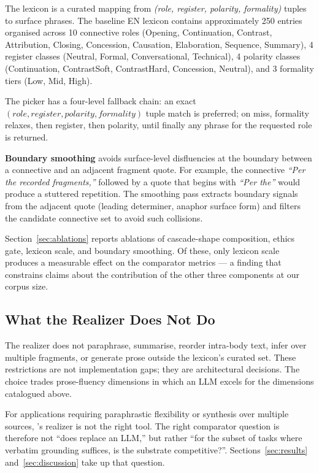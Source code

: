 The lexicon is a curated mapping from
\emph{(role, register, polarity, formality)} tuples to surface
phrases. The baseline EN lexicon contains approximately 250
entries organised across 10 connective roles
(Opening, Continuation, Contrast, Attribution, Closing,
Concession, Causation, Elaboration, Sequence, Summary), 4
register classes (Neutral, Formal, Conversational, Technical),
4 polarity classes (Continuation, ContrastSoft, ContrastHard,
Concession, Neutral), and 3 formality tiers (Low, Mid, High).

The picker has a four-level fallback chain: an exact
$(role, register, polarity, formality)$ tuple match is preferred;
on miss, formality relaxes, then register, then polarity, until
finally any phrase for the requested role is returned.

\textbf{Boundary smoothing} avoids surface-level disfluencies at
the boundary between a connective and an adjacent fragment quote.
For example, the connective \emph{``Per the recorded fragments,''}
followed by a quote that begins with \emph{``Per the''} would
produce a stuttered repetition. The smoothing pass extracts
boundary signals from the adjacent quote (leading determiner,
anaphor surface form) and filters the candidate connective set
to avoid such collisions.

Section~\ref{sec:ablations} reports ablations of cascade-shape
composition, ethics gate, lexicon scale, and boundary smoothing.
Of these, only lexicon scale produces a measurable effect on the
comparator metrics --- a finding that constrains claims about
the contribution of the other three components at our corpus
size.

\subsection{What the Realizer Does Not Do}

The realizer does not paraphrase, summarise, reorder
intra-body text, infer over multiple fragments, or generate
prose outside the lexicon's curated set. These restrictions
are not implementation gaps; they are architectural decisions.
The choice trades prose-fluency dimensions in which an LLM
excels for the dimensions catalogued above.

For applications requiring paraphrastic flexibility or
synthesis over multiple sources, \hyphae{}'s realizer is not
the right tool. The right comparator question is therefore
not ``does \hyphae{} replace an LLM,'' but rather ``for the
subset of tasks where verbatim grounding suffices, is the
substrate competitive?''. Sections~\ref{sec:results}
and~\ref{sec:discussion} take up that question.
